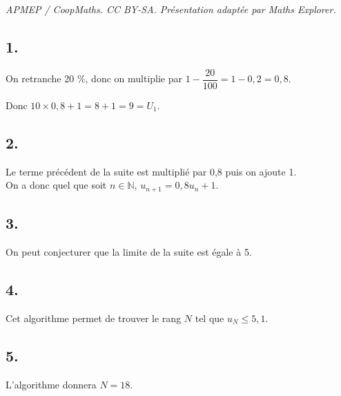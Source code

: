 \documentclass[10pt]{article}
\begin{document}
\noindent\textit{APMEP / CoopMaths. CC BY-SA. Présentation adaptée par Maths Explorer.}\par\medskip
\subsection*{1.}
	
	On retranche 20 \%, donc on multiplie par \(1 - \dfrac{20}{100} = 1 - 0,2 = 0,8\).
	
	Donc \(10 \times 0,8 + 1 = 8 + 1 = 9 = U_1\).
	
	\subsection*{2.}
	
Le terme précédent de la suite est multiplié par 0,8 puis on ajoute  1.\\
On a donc quel que soit \(n \in \mathbb{N}\), \(u_{n+1} = 0,8 u_n + 1\).
	
	\subsection*{3.}
	
	On peut conjecturer que la limite de la suite est égale à 5.
	
	\subsection*{4.}
	
	Cet algorithme permet de trouver le rang \(N\) tel que \(u_N \leq 5,1\).
	
	\subsection*{5.}
	
	L’algorithme donnera \(N = 18\).
\end{document}
